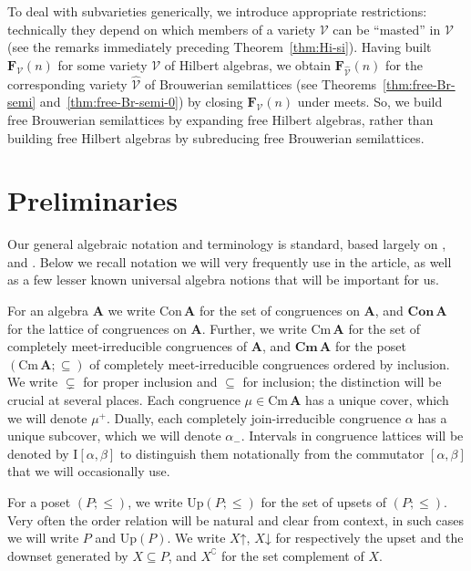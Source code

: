 \documentclass{amsart}
\newcommand{\alg}[1]{\mathbf{#1}}
\newcommand{\FV}{\alg{F}_\mathcal{V}}
\newcommand{\FVhat}{\alg{F}_{\widehat{\mathcal{V}}}}
\newcommand{\Con}[1]{\mathbf{Con}\, #1}
\newcommand{\con}[1]{\mathrm{Con}\, #1}
\newcommand{\Cm}[1]{\mathbf{Cm}\, #1}
\newcommand{\cm}[1]{\mathrm{Cm}\, #1}
\def\up#1{{#1}\mathord{\uparrow}}
\def\dw#1{{#1}\mathord{\downarrow}}
\begin{document}
To deal with subvarieties generically, we introduce appropriate restrictions:
technically they depend on which members of a variety $\mathcal{V}$ can be
``masted'' in $\mathcal{V}$ (see the remarks immediately preceding
Theorem~\ref{thm:Hi-si}). 
Having built $\FV(n)$ for some variety $\mathcal{V}$ of Hilbert algebras,
we obtain $\FVhat(n)$ for the corresponding variety
$\widehat{\mathcal{V}}$ of Brouwerian semilattices
(see Theorems~\ref{thm:free-Br-semi} and~\ref{thm:free-Br-semi-0})
by closing $\FV(n)$ under meets. So, we build free Brouwerian semilattices
by expanding free Hilbert algebras, 
rather than building free Hilbert algebras by subreducing free Brouwerian
semilattices.  



\section{Preliminaries}
Our general algebraic notation and terminology is standard, based largely on
\cite{ALVI}, and \cite{Ber11}.
Below we recall notation we will very frequently use
in the article, as well as a few lesser known universal algebra notions
that will be important for us.

For an algebra $\alg{A}$ we write
$\con{\alg{A}}$ for the set of congruences on $\alg{A}$, and
$\Con{\alg{A}}$ for the lattice of congruences on $\alg{A}$.
Further, we write $\cm{\alg{A}}$ for the
set of completely meet-irreducible congruences of $\alg{A}$, and
$\Cm{\alg{A}}$ for the poset $(\cm{\alg{A}};\subseteq)$ of completely
meet-irreducible congruences ordered by inclusion. 
We write $\subsetneq$ for proper inclusion and $\subseteq$ for inclusion; the
distinction will be crucial at several places.
Each congruence $\mu\in\cm{\alg{A}}$ has a unique cover, which we will denote $\mu^+$.
Dually, each completely join-irreducible congruence $\alpha$ has a unique
subcover, which we will denote $\alpha_-$. Intervals in congruence lattices will
be denoted by $\mathrm{I}[\alpha,\beta]$ to distinguish them notationally from
the commutator $[\alpha,\beta]$ that we will occasionally use.

For a poset $(P;\leq)$, we write $\mathrm{Up}(P;\leq)$ for the set of
upsets of $(P;\leq)$. Very often the order relation will be natural and clear
from context, in such cases we will write $P$ and $\mathrm{Up}(P)$.
We write $\up{X}$, $\dw{X}$ for respectively the upset and
the downset generated by $X\subseteq P$, and $X^\complement$ for the set complement
of $X$. 
 
\end{document}
